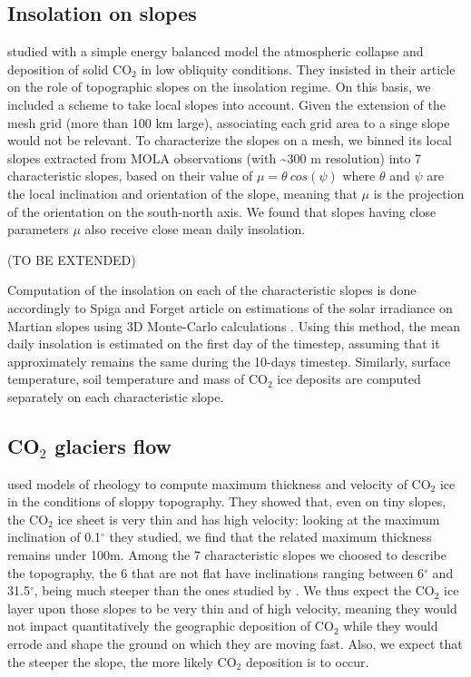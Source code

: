 \subsection{Insolation on slopes}
\label{sc:insolation_slopes}

\cite{Kres:05} studied with a simple energy balanced model the atmospheric collapse and 
deposition of solid CO$_2$ in low obliquity conditions. They insisted in their
article on the role of topographic slopes on the  insolation regime. On this basis,
 we included a scheme to take local slopes into account. Given the extension of the 
mesh grid (more than 100 km large), associating each grid area to a singe slope would 
not be relevant. To characterize the slopes on a mesh, we binned its local slopes extracted from
MOLA observations (with \textasciitilde 300 m resolution) into 7 characteristic slopes, based on
their value of $\mu = \theta ~cos(\psi)$ where $\theta$ and $\psi$ are the local inclination and 
orientation of the slope, meaning that $\mu$ is the projection of the orientation on the 
south-north axis. We found that slopes having close parameters $\mu$ also receive close mean daily
insolation.

(TO BE EXTENDED)

Computation of the insolation on each of the characteristic slopes is done accordingly to Spiga
and Forget article on estimations of the solar irradiance on Martian slopes using 3D Monte-Carlo
calculations \citep{Spig:08grl}. Using this method, the mean daily insolation is estimated on the
first day of the timestep, assuming that it approximately remains the same during the 10-days timestep.
Similarly, surface temperature, soil temperature and mass of CO$_2$ ice deposits are computed separately
on each characteristic slope. 


\subsection{CO$_2$ glaciers flow}
\label{sc:glaciers_flow}

\cite{Fast:17} used models of rheology to compute maximum thickness and velocity of CO$_2$ ice in
the conditions of sloppy topography. They showed that, even on tiny slopes, the CO$_2$ ice sheet is
very thin and has high velocity: looking at the maximum inclination of 0.1$^{\circ}$ they studied,
we find that the related maximum thickness remains under 100m.
Among the 7 characteristic slopes we choosed to describe the topography, the 6 that are not flat have
inclinations ranging between 6$^{\circ}$ and 31.5$^{\circ}$, being much steeper than the ones studied
by \citep{Fast:17}. We thus expect the CO$_2$ ice layer upon those slopes to be very thin and of
high velocity, meaning they would not impact quantitatively the geographic deposition of CO$_2$
while they would errode and shape the ground on which they are moving fast. Also, we expect that the
steeper the slope, the more likely CO$_2$ deposition is to occur.

